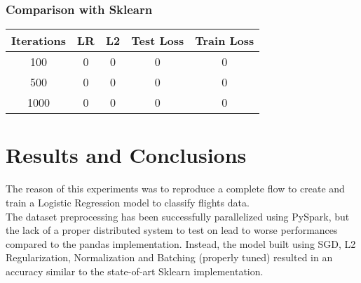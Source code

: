 \documentclass[
	letterpaper, %
	10pt, %
]{class}
\begin{document}
\subsubsection{Comparison with Sklearn}

\begin{center}
	\begin{tabular}{ |c|c|c|c|c| }
		\hline
		Iterations & LR & L2 & Test Loss & Train Loss \\
		\hline
		100        & 0  & 0  & 0         & 0          \\
		500        & 0  & 0  & 0         & 0          \\
		1000       & 0  & 0  & 0         & 0          \\
		\hline
	\end{tabular}
\end{center}



\section{Results and Conclusions}

The reason of this experiments was to reproduce a complete flow to create and train a Logistic Regression model to classify flights data.\\
The dataset preprocessing has been successfully parallelized using PySpark, but the lack of a proper distributed system to test on lead to worse performances compared to the pandas implementation.
Instead, the model built using SGD, L2 Regularization, Normalization and Batching (properly tuned) resulted in an accuracy similar to the state-of-art Sklearn implementation.


\printbibliography %


\end{document}
